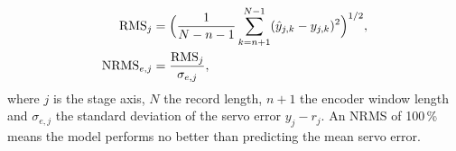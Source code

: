 \begin{equation}
\begin{aligned}
 \mathrm{RMS}_j&=\Bigl(\frac{1}{N-n-1}\sum_{k=n+1}^{N-1}(\hat y_{j,k}-y_{j,k})^2\Bigr)^{1/2},\\
 \mathrm{NRMS}_{e,j}&=\frac{\mathrm{RMS}_j}{\sigma_{e,j}},
\end{aligned}
\label{eq:setup_rms}
\end{equation}
where $j$ is the stage axis, $N$ the record length, $n+1$ the encoder
window length and $\sigma_{e,j}$ the standard deviation of the servo error
$y_j-r_j$.
An NRMS of 100\,\% means the model performs no better than predicting the mean servo error.

